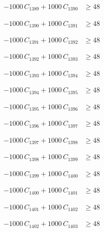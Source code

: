 \documentclass[a4paper,11pt]{article}
\begin{document}
\begin{align}
-1000\,C_{1389} + 1000\,C_{1390} &\geq 48 \nonumber
\end{align}

\begin{align}
-1000\,C_{1390} + 1000\,C_{1391} &\geq 48 \nonumber
\end{align}

\begin{align}
-1000\,C_{1391} + 1000\,C_{1392} &\geq 48 \nonumber
\end{align}

\begin{align}
-1000\,C_{1392} + 1000\,C_{1393} &\geq 48 \nonumber
\end{align}

\begin{align}
-1000\,C_{1393} + 1000\,C_{1394} &\geq 48 \nonumber
\end{align}

\begin{align}
-1000\,C_{1394} + 1000\,C_{1395} &\geq 48 \nonumber
\end{align}

\begin{align}
-1000\,C_{1395} + 1000\,C_{1396} &\geq 48 \nonumber
\end{align}

\begin{align}
-1000\,C_{1396} + 1000\,C_{1397} &\geq 48 \nonumber
\end{align}

\begin{align}
-1000\,C_{1397} + 1000\,C_{1398} &\geq 48 \nonumber
\end{align}

\begin{align}
-1000\,C_{1398} + 1000\,C_{1399} &\geq 48 \nonumber
\end{align}

\begin{align}
-1000\,C_{1399} + 1000\,C_{1400} &\geq 48 \nonumber
\end{align}

\begin{align}
-1000\,C_{1400} + 1000\,C_{1401} &\geq 48 \nonumber
\end{align}

\begin{align}
-1000\,C_{1401} + 1000\,C_{1402} &\geq 48 \nonumber
\end{align}

\begin{align}
-1000\,C_{1402} + 1000\,C_{1403} &\geq 48 \nonumber
\end{align}
\end{document}
